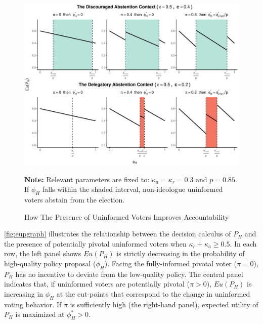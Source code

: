 \documentclass[letterpaper, 12pt]{article}
\newcommand{\floatnote}[1]{\vspace{\abovecaptionskip}\caption*{\textbf{Note:} #1}\vspace{-\abovecaptionskip}}
\begin{document}
    \begin{figure}[t!]
        \caption{How The Presence of Uninformed Voters Improves Accountability}
        \label{fig:eupgraph}
        \includegraphics[width=\linewidth]{figure/eupgraph-1}
        \floatnote{Relevant parameters are fixed to: $\kappa_a = \kappa_r = 0.3$ and $p=0.85$. If $\phi_H$ falls within the shaded interval, non-ideologue uninformed voters abstain from the election.}
    \end{figure}
    
    \par \autoref{fig:eupgraph} illustrates the relationship between the decision calculus of $P_H$ and the presence of potentially pivotal uninformed voters when $\kappa_{r}+\kappa_{a}\geq 0.5$. %
    In each row, the left panel shows $Eu(P_H)$ is strictly decreasing in the probability of high-quality policy proposal ($\phi_H$). Facing the fully-informed pivotal voter ($\pi=0$), $P_H$ has no incentive to deviate from the low-quality policy. The central panel indicates that, if uninformed voters are potentially pivotal ($\pi>0$), $Eu(P_H)$ is increasing in $\phi_H$ at the cut-points that correspond to the change in uninformed voting behavior. If $\pi$ is sufficiently high (the right-hand panel), expected utility of $P_H$ is maximized at $\phi^*_H>0$.
    
\end{document}
